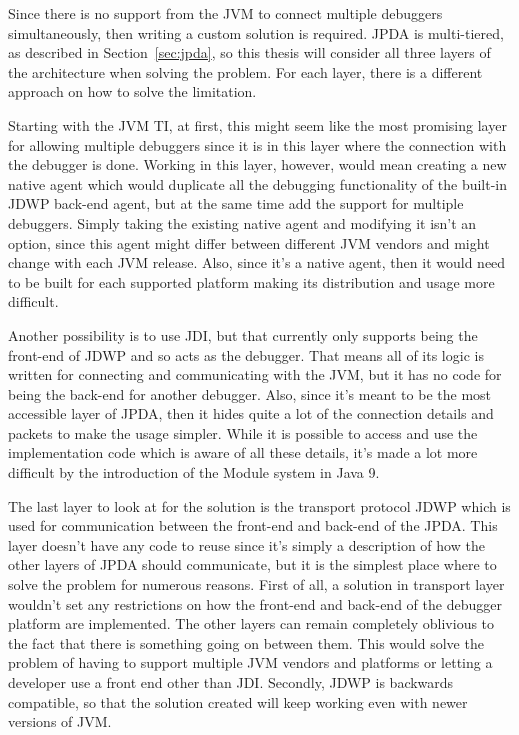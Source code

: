 \documentclass[..thesis.tex]{subfiles}
\begin{document}
Since there is no support from the JVM to connect multiple debuggers simultaneously, then writing a custom solution is required. 
JPDA is multi-tiered, as described in Section~\ref{sec:jpda}, so this thesis will consider all three layers of the architecture when solving the problem.
For each layer, there is a different approach on how to solve the limitation.

Starting with the JVM TI, at first, this might seem like the most promising layer for allowing multiple debuggers since it is in this layer where the connection with the debugger is done.
Working in this layer, however, would mean creating a new native agent which would duplicate all the debugging functionality of the built-in JDWP back-end agent, but at the same time add the support for multiple debuggers.
Simply taking the existing native agent and modifying it isn't an option, since this agent might differ between different JVM vendors and might change with each JVM release.
Also, since it's a native agent, then it would need to be built for each supported platform making its distribution and usage more difficult.

Another possibility is to use JDI, but that currently only supports being the front-end of JDWP and so acts as the debugger.
That means all of its logic is written for connecting and communicating with the JVM, but it has no code for being the back-end for another debugger.
Also, since it's meant to be the most accessible layer of JPDA, then it hides quite a lot of the connection details and packets to make the usage simpler.
While it is possible to access and use the implementation code which is aware of all these details, it's made a lot more difficult by the introduction of the Module system in Java 9.

The last layer to look at for the solution is the transport protocol JDWP which is used for communication between the front-end and back-end of the JPDA.
This layer doesn't have any code to reuse since it's simply a description of how the other layers of JPDA should communicate, but it is the simplest place where to solve the problem for numerous reasons.
First of all, a solution in transport layer wouldn't set any restrictions on how the front-end and back-end of the debugger platform are implemented.
The other layers can remain completely oblivious to the fact that there is something going on between them.
This would solve the problem of having to support multiple JVM vendors and platforms or letting a developer use a front end other than JDI.
Secondly, JDWP is backwards compatible, so that the solution created will keep working even with newer versions of JVM.
\end{document}
